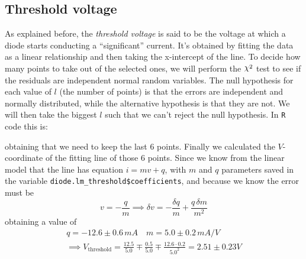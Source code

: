 \documentclass{report}
\numberwithin{equation}{section}
\theoremstyle{plain}
\theoremstyle{definition}
\theoremstyle{remark}
\DeclareRobustCommand{\rchi}{{\mathpalette\irchi\relax}} %
\newcommand{\irchi}[2]{\raisebox{\depth}{$#1\chi$}} %
\begin{document}
\subsection{Threshold voltage}
As explained before, the \emph{threshold voltage} is said to be the voltage at
which a diode starts conducting a ``significant'' current. It's obtained by
fitting the data as a linear relationship and then taking the x-intercept of the
line. To decide how many points to take out of the selected ones, we will
perform the \(\rchi^2\)  test to see if the residuals are independent normal
random variables. The null hypothesis for each value of \(l\) (the number of
points) is that the errors are independent and normally distributed, while the
alternative hypothesis is that they are not. We will then take the biggest \(l\)
such that we can't reject the null hypothesis. In \texttt{R} code this is:

obtaining that we need to keep the last 6 points. Finally we calculated the
\(V\)-coordi\-nate of the fitting line of those 6 points. Since we know from the
linear model that the line has equation \(i = mv + q\), with \(m\) and \(q\)
parameters saved in the variable \texttt{diode.lm\_threshold\$coefficients}, and
because we know the error must be 
\[
    v = -\frac{q}{m} \implies \delta v = -\frac{\delta q}{m} + \frac{q\,\delta m}{m^2}
\]
obtaining a value of 
\begin{align*}
    q = -12.6 \pm 0.6 \,mA \quad m = 5.0 \pm 0.2 \,mA / V \\
    \implies V_{\text{threshold}} = \frac{12.5}{5.0} \mp \frac{0.5}{5.0} \mp
    \frac{12.6 \cdot 0.2}{5.0^2} = 2.51 \pm 0.23 V
\end{align*}
\end{document}
